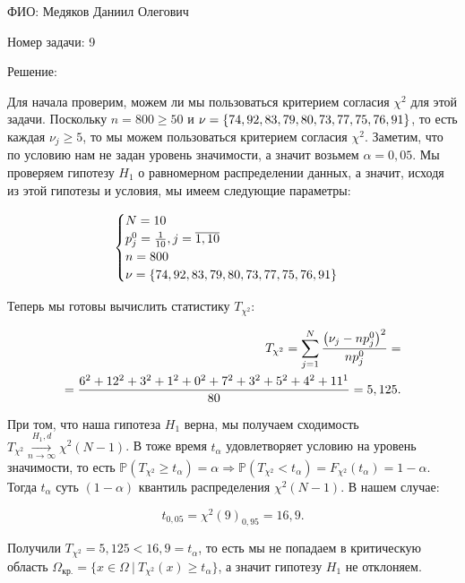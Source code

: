 \documentclass[14pt]{extarticle}
\begin{document}
ФИО: Медяков Даниил Олегович

\vspace{10pt}

Номер задачи: 9

\vspace{10pt}

Решение:

\vspace{10pt}

Для начала проверим, можем ли мы пользоваться критерием согласия $\chi^2$ для этой задачи. Поскольку $n = 800 \geq 50$ и $\nu = \{74, 92, 83,\\ 79, 80, 73, 77, 75, 76, 91\}$, то есть каждая $\nu_j \geq 5$, то мы можем пользоваться критерием согласия $\chi^2$. Заметим, что по условию нам не задан уровень значимости, а значит возьмем $\alpha = 0,05$. Мы проверяем гипотезу $H_1$ о равномерном распределении данных, а значит, исходя из этой гипотезы и условия, мы имеем следующие параметры:

\begin{eqnarray}
\notag
\begin{cases}
    N = 10\\
    p_j^0 = \frac{1}{10}, j=\overline{1, 10}\\
    n = 800\\
    \nu = \{74, 92, 83, 79, 80, 73, 77, 75, 76, 91\}
\end{cases}
\end{eqnarray}

Теперь мы готовы вычислить статистику $T_{\chi^2}$:

\begin{eqnarray}
\notag
\begin{split}
    T_{\chi^2} = \sum\limits_{j=1}^N\frac{\left(\nu_j - np_j^0\right)^2}{np_j^0} =
    \\= 
    \frac{6^2 + 12^2 + 3^2 + 1^2 + 0^2 + 7^2 + 3^2 + 5^2 + 4^2 + 11^1}{80} = 5,125.
\end{split}
\end{eqnarray}


При том, что наша гипотеза $H_1$ верна, мы получаем сходимость $T_{\chi^2}\overset{H_1, d}{\underset{n\rightarrow\infty}{\longrightarrow}} \chi^2(N-1)$. В тоже время $t_{\alpha}$ удовлетворяет условию на уровень значимости, то есть $\mathbb P(T_{\chi^2} \geq t_{\alpha}) = \alpha\Rightarrow \mathbb P(T_{\chi^2} < t_\alpha) = F_{\chi^2} (t_{\alpha}) = 1 - \alpha$. Тогда $t_{\alpha}$ суть $(1-\alpha)$ квантиль распределения $\chi^2(N-1)$. В нашем случае:

\begin{equation*}
    t_{0,05} = \chi^2(9)_{0,95} = 16,9.
\end{equation*}

Получили $T_{\chi^2} = 5,125 < 16,9 = t_{\alpha}$, то есть мы не попадаем в критическую область $\Omega_{\text{кр.}} = \{x\in\Omega ~|~ T_{\chi^2}(x) \geq t_{\alpha}\}$, а значит гипотезу $H_1$ не отклоняем.
\end{document}
